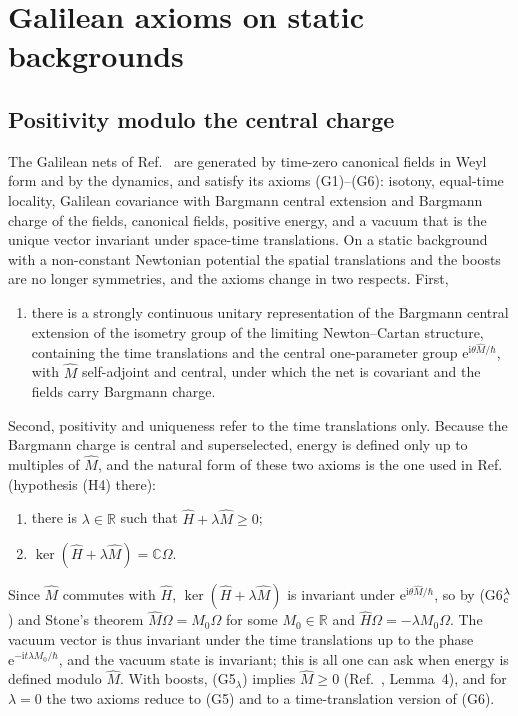 \documentclass[%
 aip,
 jmp,
 amsmath,amssymb,
 reprint, onecolumn
]{revtex4-1}
\theoremstyle{definition}
\theoremstyle{remark}
\newcommand{\R}{\mathbb{R}}
\newcommand{\C}{\mathbb{C}}
\newcommand{\rmi}{\mathrm{i}}
\newcommand{\rme}{\mathrm{e}}
\begin{document}
\section{Galilean axioms on static backgrounds}\label{sec:axioms}

\subsection{Positivity modulo the central charge}

The Galilean nets of
Ref.~ are
generated by time-zero canonical fields in Weyl form and by the dynamics,
and satisfy its axioms (G1)--(G6): isotony, equal-time locality, Galilean
covariance with Bargmann central extension and Bargmann charge of the
fields, canonical fields, positive energy, and a vacuum that is the
unique vector invariant under space-time translations. On a static background
with a non-constant Newtonian potential the spatial translations and
the boosts are no longer symmetries, and the axioms change in two
respects. First,
\begin{enumerate}
\item[(G3$_{\rm c}$)] there is a strongly continuous unitary
representation of the Bargmann central extension of the isometry group
of the limiting Newton--Cartan structure, containing the time
translations and the central one-parameter group
$\rme^{\rmi\theta\hat M/\hbar}$, with $\hat M$ self-adjoint and central,
under which the net is covariant and the fields carry Bargmann
charge.
\end{enumerate}
Second, positivity and uniqueness refer to the time translations only.
Because the Bargmann charge is central and superselected, energy is
defined only up to multiples of $\hat M$, and the natural form of these
two axioms is the one used in
Ref.~
(hypothesis (H4) there):
\begin{enumerate}
\item[(G5$_\lambda$)] there is $\lambda\in\R$ such that $\hat H+
\lambda\hat M\geq0$;
\item[(G6$_{\rm c}^\lambda$)] $\ker(\hat H+\lambda\hat M)=\C\Omega$.
\end{enumerate}
Since $\hat M$ commutes with $\hat H$, $\ker(\hat H+\lambda\hat M)$ is
invariant under $\rme^{\rmi\theta\hat M/\hbar}$, so by
(G6$_{\rm c}^\lambda$) and Stone's theorem $\hat M\Omega=M_0\Omega$ for
some $M_0\in\R$ and $\hat H\Omega=-\lambda M_0\Omega$. The vacuum vector
is thus invariant under the time translations up to the phase
$\rme^{-\rmi t\lambda M_0/\hbar}$, and the vacuum state is invariant; this
is all one can ask when energy is defined modulo $\hat M$.
With boosts, (G5$_\lambda$) implies $\hat M\geq0$
(Ref.~,
Lemma~4), and for $\lambda=0$ the two axioms reduce to (G5) and to a
time-translation version of (G6).
\end{document}
